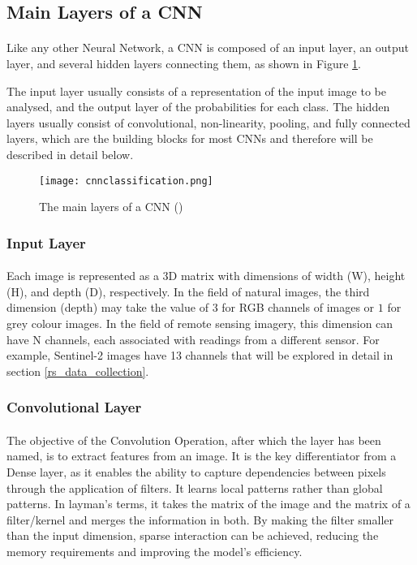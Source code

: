 \subsection{Main Layers of a \gls{CNN}} \label{cnn_layers}
\paragraph{}
Like any other Neural Network, a \gls{CNN} is composed of an input layer, an output layer, and several hidden layers connecting them, as shown in Figure \ref{fig_cnn_layers}.

The input layer usually consists of a representation of the input image to be analysed, and the output layer of the probabilities for each class.
The hidden layers usually consist of convolutional, non-linearity, pooling, and fully connected layers, which are the building blocks for most \gls{CNN}s and therefore will be described in detail below.

    \begin{figure}[hbt!]
        \centering
        \texttt{[image: cnnclassification.png]}
        \caption{The main layers of a \gls{CNN} (\cite{10.6109/JICCE.2018.16.3.173})}
        \label{fig_cnn_layers}
    \end{figure}

\subsubsection{Input Layer}
\paragraph{}
Each image is represented as a 3D matrix with dimensions of width (W), height (H), and depth (D), respectively. In the field of natural images, the third dimension (depth) may take the value of $3$ for \gls{RGB} channels of images or $1$ for grey colour images. In the field of remote sensing imagery, this dimension can have N channels, each associated with readings from a different sensor. For example, Sentinel-2 images have 13 channels that will be explored in detail in section \ref{rs_data_collection}. 

\subsubsection{Convolutional Layer}
\paragraph{}
The objective of the Convolution Operation, after which the layer has been named, is to extract features from an image. It is the key differentiator from a Dense layer, as it enables the ability to capture dependencies between pixels through the application of filters. It learns local patterns rather than global patterns.
In layman's terms, it takes the matrix of the image and the matrix of a filter/kernel and merges the information in both. By making the filter smaller than the input dimension, sparse interaction can be achieved, reducing the memory requirements and improving the model's efficiency.


